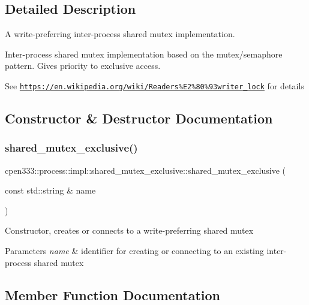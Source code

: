 \subsection{Detailed Description}
A write-\/preferring inter-\/process shared mutex implementation. 

Inter-\/process shared mutex implementation based on the mutex/semaphore pattern. Gives priority to exclusive access.

See \href{https://en.wikipedia.org/wiki/Readers%E2%80%93writer_lock}{\tt https\+://en.\+wikipedia.\+org/wiki/\+Readers\%\+E2\%80\%93writer\+\_\+lock} for details 

\subsection{Constructor \& Destructor Documentation}
\mbox{\label{classcpen333_1_1process_1_1impl_1_1shared__mutex__exclusive_a3acb5fa0c2f3f12200d194d53f7dfad4}} 
\subsubsection{\texorpdfstring{shared\+\_\+mutex\+\_\+exclusive()}{shared\_mutex\_exclusive()}}
{\footnotesize\ttfamily cpen333\+::process\+::impl\+::shared\+\_\+mutex\+\_\+exclusive\+::shared\+\_\+mutex\+\_\+exclusive (\begin{DoxyParamCaption}\item[{const std\+::string \&}]{name }\end{DoxyParamCaption})\hspace{0.3cm}{\ttfamily [inline]}}

Constructor, creates or connects to a write-\/preferring shared mutex 
\begin{DoxyParams}{Parameters}
{\em name} & identifier for creating or connecting to an existing inter-\/process shared mutex \\
\hline
\end{DoxyParams}


\subsection{Member Function Documentation}
\mbox{\label{classcpen333_1_1process_1_1impl_1_1shared__mutex__exclusive_a6b6d61dce0f1a536d24e280c4e7ac9a9}} 
